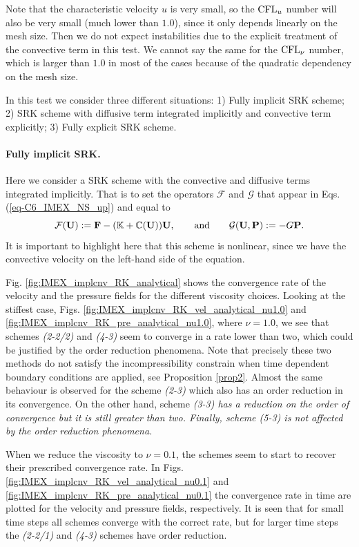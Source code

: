Note that the characteristic velocity $u$ is very small, so the ${\rm CFL}_u$ number will also be very small (much lower than $1.0$), since it only depends linearly on the mesh size. Then we do not expect instabilities due to the explicit treatment of the convective term in this test. We cannot say the same for the ${\rm CFL}_\nu$ number, which is larger than $1.0$ in most of the cases because of the quadratic dependency on the mesh size.

In this test we consider three different situations: 1) Fully implicit SRK scheme; 2) SRK scheme with diffusive term integrated implicitly and convective term explicitly; 3) Fully explicit SRK scheme.

\paragraph{Fully implicit SRK.}

Here we consider a SRK scheme with the convective and diffusive terms integrated implicitly. That is to set the operators $\mathcal{F}$ and $\mathcal{G}$ that appear in Eqs. (\ref{eq-C6_IMEX_NS_up}) and  equal to
$$\mathcal{F}({\bf U}):={\bf F}-(\mathbb{K}+\mathbb{C}({\bf U})){\bf U},\quad\quad\mbox{and}\quad\quad\mathcal{G}({\bf U},{\bf P}):=-G{\bf P}.$$
It is important to highlight here that this scheme is nonlinear, since we have the convective velocity on the left-hand side of the equation.

Fig. \ref{fig:IMEX_implcnv_RK_analytical} shows the convergence rate of the velocity and the pressure fields for the different viscosity choices. Looking at the stiffest case, Figs. \ref{fig:IMEX_implcnv_RK_vel_analytical_nu1.0} and \ref{fig:IMEX_implcnv_RK_pre_analytical_nu1.0}, where $\nu=1.0$, we see that schemes \textit{(2-2/2)} and \textit{(4-3)} seem to converge in a rate lower than two, which could be justified by the order reduction phenomena. Note that precisely these two methods do not satisfy the incompressibility constrain when time dependent boundary conditions are applied, see Proposition \ref{prop2}. Almost the same behaviour is observed for the scheme \textit{(2-3)} which also has an order reduction in its convergence. On the other hand, scheme \textit{(3-3) has a reduction on the order of convergence but it is still greater than two. Finally, scheme \textit{(5-3)} is not affected by the order reduction phenomena.}

When we reduce the viscosity to $\nu=0.1$, the schemes seem to start to recover their prescribed convergence rate. In Figs. \ref{fig:IMEX_implcnv_RK_vel_analytical_nu0.1} and  \ref{fig:IMEX_implcnv_RK_pre_analytical_nu0.1} the convergence rate in time are plotted for the velocity and pressure fields, respectively. It is seen that for small time steps all schemes converge with the correct rate, but for larger time steps the \textit{(2-2/1)} and \textit{(4-3)} schemes have order reduction.

